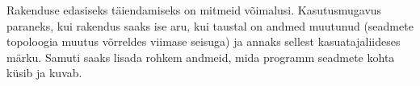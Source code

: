 \documentclass[12pt]{article}
\begin{document}
Rakenduse edasiseks täiendamiseks on mitmeid võimalusi.
Kasutusmugavus paraneks, kui rakendus saaks ise aru, kui taustal on andmed muutunud (seadmete
topoloogia muutus võrreldes viimase seisuga) ja annaks sellest kasuatajaliideses märku.
Samuti saaks lisada rohkem andmeid, mida programm seadmete kohta küsib ja kuvab.









%
%
%
%
%
%
%
%
%
%
\end{document}
